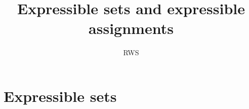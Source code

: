 \documentclass[aps,english,superscriptaddress,onecolumn,twoside,longbibliography,pra,floatfix,fleqn,nofootinbib]{revtex4-1}%
\theoremstyle{definition}
\begin{document}
\title{Expressible sets and expressible assignments}

\author{RWS}


\maketitle

\section{Expressible sets}
\end{document}
